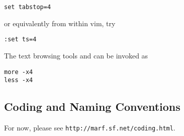 \begin{verbatim}
set tabstop=4
\end{verbatim}

    or equivalently from within vim, try

\begin{verbatim}
:set ts=4
\end{verbatim}

    The text browsing tools  and
     can be invoked as

\begin{verbatim}
more -x4
less -x4
\end{verbatim}


\subsection{Coding and Naming Conventions}

For now, please see \texttt{http://marf.sf.net/coding.html}.

{\todo}

